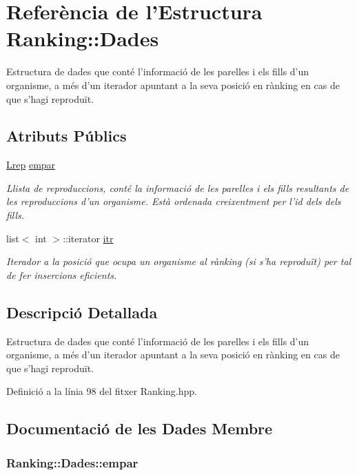 \hypertarget{struct_ranking_1_1_dades}{\section{Referència de l'Estructura Ranking\-:\-:Dades}
\label{struct_ranking_1_1_dades}
}


Estructura de dades que conté l'informació de les parelles i els fills d'un organisme, a més d'un iterador apuntant a la seva posició en rànking en cas de que s'hagi reproduït.  


\subsection*{Atributs Públics}
\begin{DoxyCompactItemize}
\item 
\hyperlink{class_ranking_a6cdd02db4b2c2187ae5d7294330b9189}{Lrep} \hyperlink{struct_ranking_1_1_dades_a175e0290476b144b7fa7f96d3c63a13e}{empar}
\begin{DoxyCompactList}\small\item\em Llista de reproduccions, conté la informació de les parelles i els fills resultants de les reproduccions d'un organisme. Està ordenada creixentment per l'id dels dels fills. \end{DoxyCompactList}\item 
list$<$ int $>$\-::iterator \hyperlink{struct_ranking_1_1_dades_ad6eba4c911d6b7feb63b237613e59436}{itr}
\begin{DoxyCompactList}\small\item\em Iterador a la posició que ocupa un organisme al rànking (si s'ha reproduït) per tal de fer insercions eficients. \end{DoxyCompactList}\end{DoxyCompactItemize}


\subsection{Descripció Detallada}
Estructura de dades que conté l'informació de les parelles i els fills d'un organisme, a més d'un iterador apuntant a la seva posició en rànking en cas de que s'hagi reproduït. 

Definició a la línia 98 del fitxer Ranking.\-hpp.



\subsection{Documentació de les Dades Membre}
\hypertarget{struct_ranking_1_1_dades_a175e0290476b144b7fa7f96d3c63a13e}{
\subsubsection[{empar}]{ Ranking\-::\-Dades\-::empar}}\label{struct_ranking_1_1_dades_a175e0290476b144b7fa7f96d3c63a13e}


